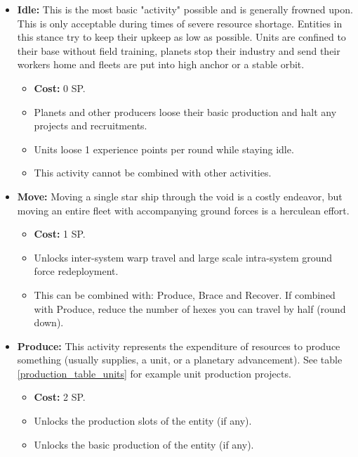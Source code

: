 \begin{itemize}
	\item \textbf{Idle:} This is the most basic "activity" possible and is generally frowned upon. This is only acceptable during times of severe resource shortage. Entities in this stance try to keep their upkeep as low as possible. Units are confined to their base without field training, planets stop their industry and send their workers home and fleets are put into high anchor or a stable orbit.
	\begin{itemize}
		\item \textbf{Cost:} 0 SP.
		\item Planets and other producers loose their basic production and halt any projects and recruitments.
		\item Units loose 1 experience points per round while staying idle.
		\item This activity cannot be combined with other activities.
	\end{itemize}

	\item \textbf{Move:} Moving a single star ship through the void is a costly endeavor, but moving an entire fleet with accompanying ground forces is a herculean effort.
	\begin{itemize}
		\item \textbf{Cost:} 1 SP.
		\item Unlocks inter-system warp travel and large scale intra-system ground force redeployment.
		\item This can be combined with: Produce, Brace and Recover. If combined with Produce, reduce the number of hexes you can travel by half (round down).
	\end{itemize}

	
	\item \textbf{Produce:} This activity represents the expenditure of resources to produce something (usually supplies, a unit, or a planetary advancement). See table \ref{production_table_units} for example unit production projects.
	\begin{itemize}
		\item \textbf{Cost:} 2 SP.
		\item Unlocks the production slots of the entity (if any).
		\item Unlocks the basic production of the entity (if any).
	\end{itemize}
	

\end{itemize}
